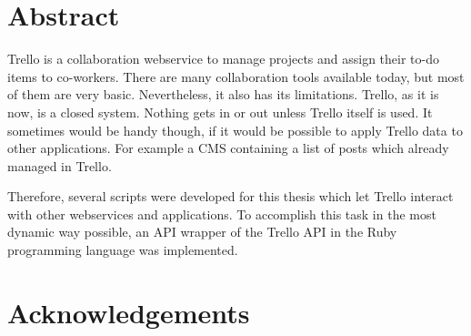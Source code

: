 \documentclass[twoside,12pt,a4paper, parskip=full-]{report}
\begin{document}

\setcounter{page}{1}


\onehalfspacing
\setlength{\parskip}{1ex plus 0.5ex minus 0.2ex}

\section*{Abstract}

Trello is a collaboration webservice to manage projects and assign their to-do items to co-workers. There are many collaboration tools available today, but most of them are very basic. Nevertheless, it also has its limitations. Trello, as it is now, is a closed system. Nothing gets in or out unless Trello itself is used. It sometimes would be handy though, if it would be possible to apply Trello data to other applications. For example a CMS containing a list of posts which already managed in Trello.
 
Therefore, several scripts were developed for this thesis which let Trello interact with other webservices and applications. To accomplish this task in the most dynamic way possible, an API wrapper of the Trello API in the Ruby programming language was implemented.\\[5mm]

\newpage

\section*{Acknowledgements}

\cleardoublepage

\end{document}

